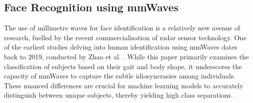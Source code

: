 \documentclass{mpaper}
\begin{document}
\subsection{Face Recognition using mmWaves}
The use of millimetre waves for face identification is a relatively new avenue of research, fuelled by the recent commercialisation of radar sensor technology. One of the earliest studies delving into human identification using mmWaves dates back to 2019, conducted by Zhao et al. \cite{zhao2019mid}. While this paper primarily examines the classification of subjects based on their gait and body shape, it underscores the capacity of mmWaves to capture the subtle idiosyncrasies among individuals. These nuanced differences are crucial for machine learning models to accurately distinguish between unique subjects, thereby yielding high class separations.
\end{document}
